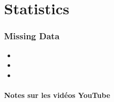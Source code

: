 \documentclass[12pt, titlepage, french]{report}
\begin{document}

\tableofcontents

\clearpage

\part*{Statistics}

\section*{Missing Data}

\begin{YTB_vids}
\begin{itemize}
	\item	{}
	\item	{}
	\item	{}
\end{itemize}
\end{YTB_vids}

\subsection*{Notes sur les vidéos YouTube}
\end{document}
